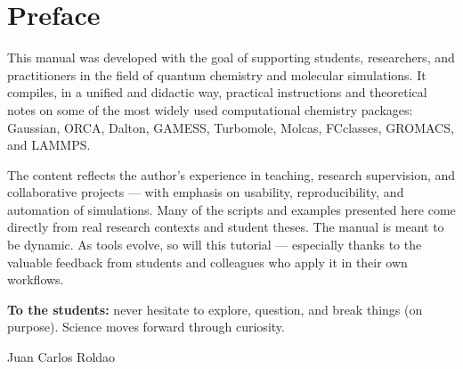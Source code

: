 \chapter*{Preface}

This manual was developed with the goal of supporting students, researchers, and practitioners in the field of quantum chemistry and molecular simulations. It compiles, in a unified and didactic way, practical instructions and theoretical notes on some of the most widely used computational chemistry packages: Gaussian, ORCA, Dalton, GAMESS, Turbomole, Molcas, FCclasses, GROMACS, and LAMMPS.

The content reflects the author's experience in teaching, research supervision, and collaborative projects — with emphasis on usability, reproducibility, and automation of simulations. Many of the scripts and examples presented here come directly from real research contexts and student theses. The manual is meant to be dynamic. As tools evolve, so will this tutorial — especially thanks to the valuable feedback from students and colleagues who apply it in their own workflows.

\textbf{To the students:} never hesitate to explore, question, and break things (on purpose). Science moves forward through curiosity.

\vspace{1em}
\hfill Juan Carlos Roldao

